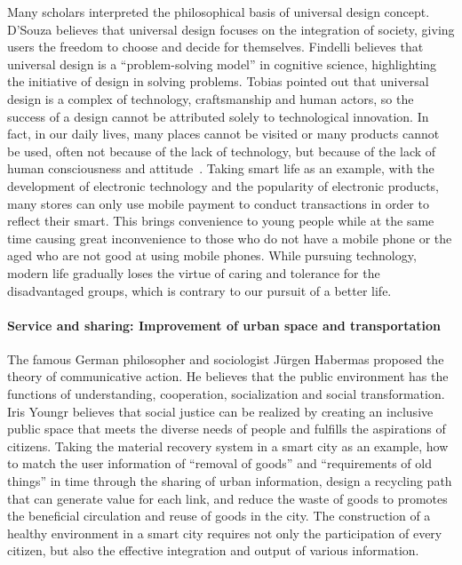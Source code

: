 \documentclass[letterpaper, twocolumn, 10pt, conference]{IEEEtran}
\begin{document}
Many scholars interpreted the philosophical basis of universal design concept. D’Souza believes that universal design focuses on the integration of society, giving users the freedom to choose and decide for themselves. Findelli believes that universal design is a \enquote{problem-solving model} in cognitive science, highlighting the initiative of design in solving problems. Tobias pointed out that universal design is a complex of technology, craftsmanship and human actors, so the success of a design cannot be attributed solely to technological innovation. In fact, in our daily lives, many places cannot be visited or many products cannot be used, often not because of the lack of technology, but because of the lack of human consciousness and attitude~\cite{imrie2012universalism}. Taking smart life as an example, with the development of electronic technology and the popularity of electronic products, many stores can only use mobile payment to conduct transactions in order to reflect their smart. This brings convenience to young people while at the same time causing great inconvenience to those who do not have a mobile phone or the aged who are not good at using mobile phones. While pursuing technology, modern life gradually loses the virtue of caring and tolerance for the disadvantaged groups, which is contrary to our pursuit of a better life.

\paragraph{Service and sharing: Improvement of urban space and transportation}

The famous German philosopher and sociologist Jürgen Habermas proposed the theory of communicative action. He believes that the public environment has the functions of understanding, cooperation, socialization and social transformation. Iris Youngr believes that social justice can be realized by creating an inclusive public space that meets the diverse needs of people and fulfills the aspirations of citizens. Taking the material recovery system in a smart city as an example, how to match the user information of \enquote{removal of goods} and \enquote{requirements of old things} in time through the sharing of urban information, design a recycling path that can generate value for each link, and reduce the waste of goods to promotes the beneficial circulation and reuse of goods in the city. The construction of a healthy environment in a smart city requires not only the participation of every citizen, but also the effective integration and output of various information.
\end{document}
